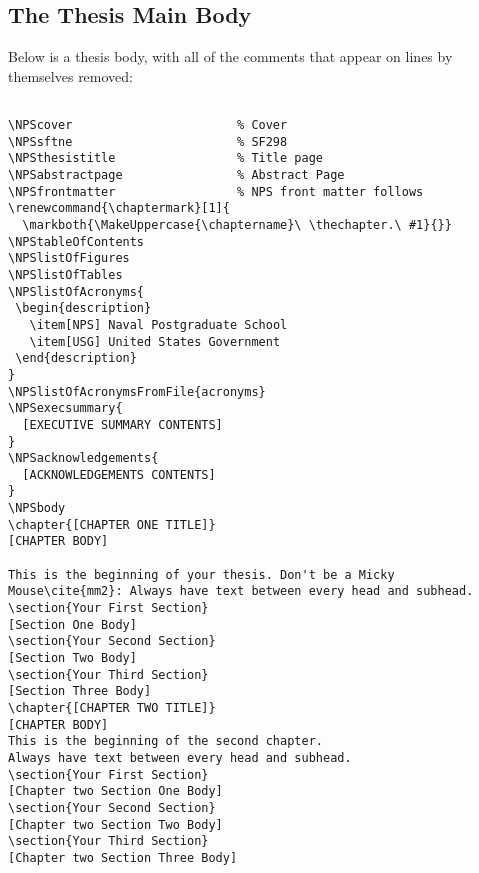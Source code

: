 \subsection{The Thesis Main Body}
Below is a thesis body, with all of the comments that appear on
lines by themselves removed:
\begin{Verbatim}[fontsize=\small]

\NPScover                       % Cover
\NPSsftne                       % SF298
\NPSthesistitle                 % Title page
\NPSabstractpage                % Abstract Page
\NPSfrontmatter                 % NPS front matter follows
\renewcommand{\chaptermark}[1]{
  \markboth{\MakeUppercase{\chaptername}\ \thechapter.\ #1}{}}
\NPStableOfContents
\NPSlistOfFigures
\NPSlistOfTables
\NPSlistOfAcronyms{
 \begin{description}
   \item[NPS] Naval Postgraduate School
   \item[USG] United States Government
 \end{description}
}
\NPSlistOfAcronymsFromFile{acronyms}
\NPSexecsummary{
  [EXECUTIVE SUMMARY CONTENTS]
}
\NPSacknowledgements{
  [ACKNOWLEDGEMENTS CONTENTS]
}
\NPSbody
\chapter{[CHAPTER ONE TITLE]}
[CHAPTER BODY]

This is the beginning of your thesis. Don't be a Micky
Mouse\cite{mm2}: Always have text between every head and subhead.
\section{Your First Section}
[Section One Body]
\section{Your Second Section}
[Section Two Body]
\section{Your Third Section}
[Section Three Body]
\chapter{[CHAPTER TWO TITLE]}
[CHAPTER BODY]
This is the beginning of the second chapter. 
Always have text between every head and subhead.
\section{Your First Section}
[Chapter two Section One Body]
\section{Your Second Section}
[Chapter two Section Two Body]
\section{Your Third Section}
[Chapter two Section Three Body]
\end{Verbatim}

